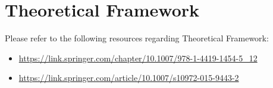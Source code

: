 %
%
%                 

\chapter{Theoretical Framework}
\label{sec:theoframework}
Please refer to the following resources regarding Theoretical Framework: 

\begin{itemize}

\item \url{https://link.springer.com/chapter/10.1007/978-1-4419-1454-5_12}
\item \url{https://link.springer.com/article/10.1007/s10972-015-9443-2}



\end{itemize}


